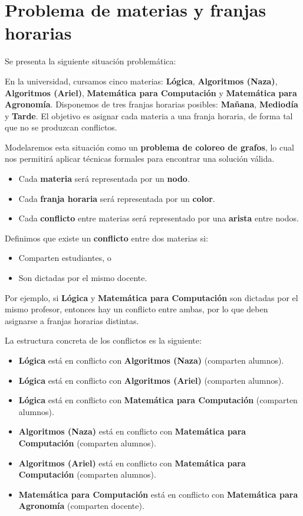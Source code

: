 \documentclass[a4paper,11pt]{article}
\begin{document}
\newpage
\section{Problema de materias y franjas horarias}

Se presenta la siguiente situación problemática:

En la universidad, cursamos cinco materias: \textbf{Lógica}, \textbf{Algoritmos (Naza)}, \textbf{Algoritmos (Ariel)}, \textbf{Matemática para Computación} y \textbf{Matemática para Agronomía}. Disponemos de tres franjas horarias posibles: \textbf{Mañana}, \textbf{Mediodía} y \textbf{Tarde}. El objetivo es asignar cada materia a una franja horaria, de forma tal que no se produzcan conflictos.

Modelaremos esta situación como un \textbf{problema de coloreo de grafos}, lo cual nos permitirá aplicar técnicas formales para encontrar una solución válida.

\begin{itemize}
    \item Cada \textbf{materia} será representada por un \textbf{nodo}.
    \item Cada \textbf{franja horaria} será representada por un \textbf{color}.
    \item Cada \textbf{conflicto} entre materias será representado por una \textbf{arista} entre nodos.
\end{itemize}

Definimos que existe un \textbf{conflicto} entre dos materias si:
\begin{itemize}
    \item Comparten estudiantes, o
    \item Son dictadas por el mismo docente.
\end{itemize}

Por ejemplo, si \textbf{Lógica} y \textbf{Matemática para Computación} son dictadas por el mismo profesor, entonces hay un conflicto entre ambas, por lo que deben asignarse a franjas horarias distintas.

La estructura concreta de los conflictos es la siguiente:
\begin{itemize}
    \item \textbf{Lógica} está en conflicto con \textbf{Algoritmos (Naza)} (comparten alumnos).
    \item \textbf{Lógica} está en conflicto con \textbf{Algoritmos (Ariel)} (comparten alumnos).
    \item \textbf{Lógica} está en conflicto con \textbf{Matemática para Computación} (comparten alumnos).
    \item \textbf{Algoritmos (Naza)} está en conflicto con \textbf{Matemática para Computación} (comparten alumnos).
    \item \textbf{Algoritmos (Ariel)} está en conflicto con \textbf{Matemática para Computación} (comparten alumnos).
    \item \textbf{Matemática para Computación} está en conflicto con \textbf{Matemática para Agronomía} (comparten docente).
\end{itemize}
\end{document}

